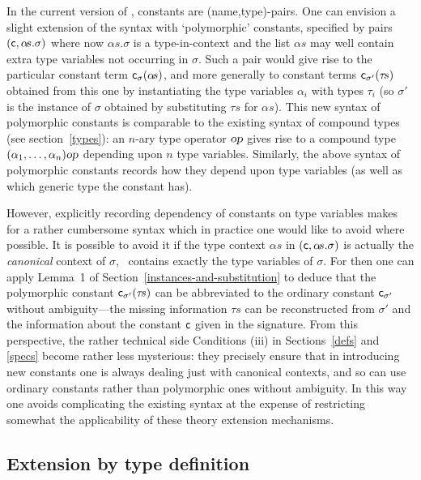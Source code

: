 In the current version of \HOL, constants are (name,type)-pairs.
One can envision a slight extension of the \HOL{} syntax with
`polymorphic' constants, specified by pairs
$({\sf c},\alpha\!s.\sigma)$ where now $\alpha\!s.\sigma$ is a
type-in-context and the list $\alpha\!s$ may well contain extra type
variables not occurring in $\sigma$. Such a pair would give rise
to the particular constant term
${\sf c}_\sigma(\alpha\!s)$, and more generally to
constant terms ${\sf c}_{\sigma'}(\tau\!s)$ obtained from
this one by instantiating the type variables $\alpha_i$ with types
$\tau_i$ (so $\sigma'$ is the instance of $\sigma$ obtained by
substituting $\tau\!s$ for $\alpha\!s$). This new syntax of polymorphic
constants is comparable to the existing syntax of compound types (see
section~\ref{types}): an $n$-ary type operator $\textsl{op}$ gives rise to a
compound type $(\alpha_1,\ldots,\alpha_n){\textsl{op}}$ depending upon $n$
type variables. Similarly, the above syntax of polymorphic constants
records how they depend upon type variables (as well as which generic
type the constant has).

However, explicitly recording dependency of constants on type variables
makes for a rather cumbersome syntax which in practice one would like
to avoid where possible. It is possible to avoid it if the type
context $\alpha\!s$ in $({\sf c},\alpha\!s.\sigma)$ is actually the
{\em canonical\/} context of $\sigma$, \ie\ contains exactly the type
variables of $\sigma$.  For then one can apply Lemma~1 of
Section~\ref{instances-and-substitution} to deduce that the
polymorphic constant ${\sf c}_{\sigma'}(\tau\!s)$ can be abbreviated
to the ordinary constant ${\sf c}_{\sigma'}$ without ambiguity---the
missing information $\tau\!s$ can be reconstructed from $\sigma'$ and
the information about the constant ${\sf c}$ given in the signature.
From this perspective, the rather technical side Conditions (iii) in
Sections~\ref{defs} and \ref{specs} become rather less mysterious:
they precisely ensure that in introducing new constants one is always
dealing just with canonical contexts, and so can use ordinary constants
rather than polymorphic ones without ambiguity. In this way one avoids
complicating the existing syntax at the expense of restricting
somewhat the applicability of these theory extension mechanisms.


\subsection{Extension by type definition}
\label{tydefs}

